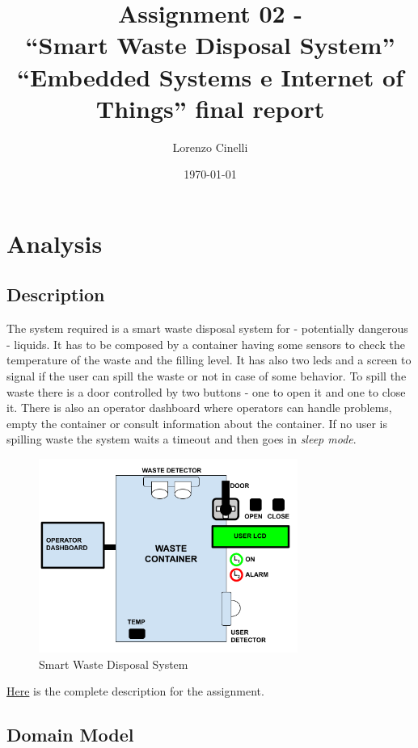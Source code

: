 \documentclass[a4paper,12pt]{report}
\title{Assignment 02 - \\``Smart Waste Disposal System''\\
    \large ``Embedded Systems e Internet of Things'' final report}
\author{Lorenzo Cinelli}
\date{\today}
\begin{document}
\maketitle

\tableofcontents

\chapter{Analysis}

    \section{Description}

        The system required is a smart waste disposal system for - potentially dangerous - liquids. It has to be composed by a container having some sensors to check the temperature of the waste and the filling level. It has also two leds and a screen to signal if the user can spill the waste or not in case of some behavior. To spill the waste there is a door controlled by two buttons - one to open it and one to close it. 
        There is also an operator dashboard where operators can handle problems, empty the container or consult information about the container. If no user is spilling waste the system waits a timeout and then goes in \textit{sleep mode}. 

        \begin{figure}[H]
        	\centering{}
        	\includegraphics[width=240pt]{img/Assignment-02_SWDS-Domain.png}
        	\caption{Smart Waste Disposal System}
        	\label{img:system}
        \end{figure}
        \centerline{\href{https://docs.google.com/document/d/1iFXGmo7RVZMpJ5bxUN5ms_qFqg2B-wecRc0sfas9rQ4/edit?tab=t.0}{Here} is the complete description for the assignment.}
            
    \section{Domain Model}
    
\end{document}
